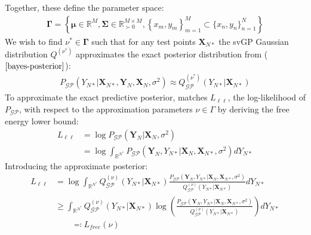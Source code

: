 \documentclass{article}
\newcommand{\GP}{\operatorname{\mathcal{GP}}}
\numberwithin{equation}{section}
\begin{document}
Together, these define the parameter space:
\begin{align}
    \mathbf{\Gamma} = \left\{\boldsymbol{\mu} \in \mathbb{R}^{M}, \mathbf{\Sigma} \in \mathbb{R}^{M\times M}_{\succ 0}, \left\{x_m, y_m\right\}_{m=1}^{M} \subset \{x_n, y_n\}_{n=1}^{N}\right\}
    \label{svgp-parameter-space}
\end{align}
We wish to find $\nu^* \in \mathbf{\Gamma}$ such that for any test points $\mathbf{X}_{N*}$ the svGP Gaussian distribution $Q^{(\nu^*)}$ approximates the exact posterior distribution from ($\ref{bayes-posterior}$):
\begin{align}
    P_{\GP}\left(Y_{N*} \vert \mathbf{X}_{N*}, \mathbf{Y}_N, \mathbf{X}_N, \sigma^2 \right) \approx Q_{\GP}^{(\nu^*)}\left(Y_{N*} \vert \mathbf{X}_{N*}\right)
    \label{svgp-desired-approximation}
\end{align}
To approximate the exact predictive posterior, \cite{titsias2009variational} matches $L_{\ell \ell}$, the log-likelihood of $P_{\GP}$, with respect to the approximation parameters $\nu \in \Gamma$ by deriving the free energy lower bound:
\begin{align}
    L_{\ell \ell} &= \log P_{\GP}\left(\mathbf{Y}_N \vert \mathbf{X}_N, \sigma^2\right)
    \\ &= \log \int_{\mathbb{R}^{N^*}} P_{\GP}\left(\mathbf{Y}_N, Y_{N*} \vert \mathbf{X}_{N}, \mathbf{X}_{N*}, \sigma^2\right) d Y_{N*}
    \label{log-like}
\end{align}
Introducing the approximate posterior:
\begin{align}
L_{\ell \ell} &= \log \int_{\mathbb{R}^{N^*}} Q^{(\nu)}_{\GP}\left(Y_{N*} \vert \mathbf{X}_{N*}\right) \frac{P_{\GP}\left(\mathbf{Y}_N, Y_{N*} \vert \mathbf{X}_{N}, \mathbf{X}_{N*}, \sigma^2\right)}{Q^{(\nu)}_{\GP}\left(Y_{N*} \vert \mathbf{X}_{N*}\right)} d Y_{N*}\\
&\geq \int_{\mathbb{R}^{N^*}} Q^{(\nu)}_{\GP}\left(Y_{N*} \vert \mathbf{X}_{N*}\right) \log\left(\frac{P_{\GP}\left(\mathbf{Y}_N, Y_{N*} \vert \mathbf{X}_{N}, \mathbf{X}_{N*}, \sigma^2\right)}{Q^{(\nu)}_{\GP}\left(Y_{N*} \vert \mathbf{X}_{N*}\right)} \right)d Y_{N*}
 \label{elbo-jensen}
 \\ & \qquad \eqqcolon L_{free}(\nu)
 \label{elbo-definition}
\end{align}
\end{document}
